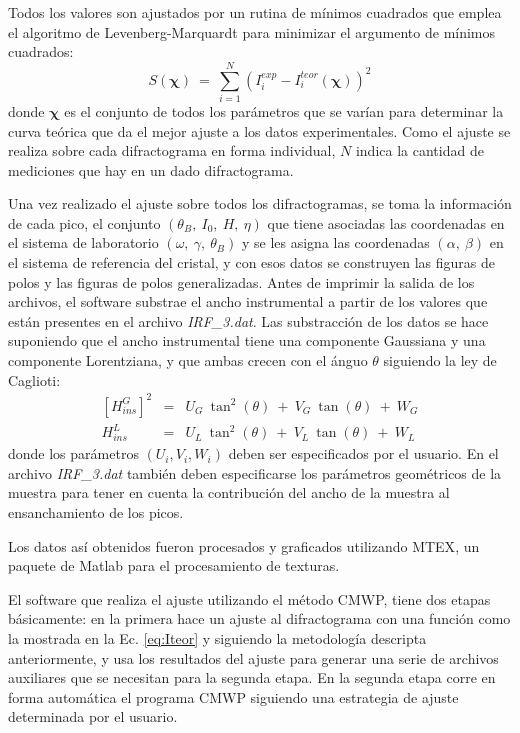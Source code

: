 Todos los valores son ajustados por un rutina de mínimos cuadrados que emplea el algoritmo de Levenberg-Marquardt\cite{wiki:Levenberg} para minimizar el argumento de mínimos cuadrados:
\begin{equation}
  S(\mathbf{\chi}) \ = \ \sum_{i=1}^{N} (I^{exp}_i - I^{teor}_i(\mathbf{\chi}))^2
  \label{eq:argmin}
\end{equation}
\noindent
donde $\mathbf{\chi}$ es el conjunto de todos los parámetros que se varían para determinar la curva teórica que da el mejor ajuste a los datos experimentales.
Como el ajuste se realiza sobre cada difractograma en forma individual, $N$ indica la cantidad de mediciones que hay en un dado difractograma.

Una vez realizado el ajuste sobre todos los difractogramas, se toma la información de cada pico, el conjunto $(\theta_B, \ I_0, \ H, \ \eta)$ que tiene asociadas las coordenadas en el sistema de laboratorio $(\omega, \ \gamma, \ \theta_B)$ y se les asigna las coordenadas  $(\alpha, \ \beta)$ en el sistema de referencia del cristal, y con esos datos se construyen las figuras de polos y las figuras de polos generalizadas.
Antes de imprimir la salida de los archivos, el software substrae el ancho instrumental a partir de los valores que están presentes en el archivo \textit{IRF\_3.dat}.
Las substracción de los datos se hace suponiendo que el ancho instrumental tiene una componente Gaussiana y una componente Lorentziana, y que ambas crecen con el ánguo $\theta$ siguiendo la ley de Caglioti\cite{Caglioti1958}:
\begin{eqnarray}
  \left[H_{ins}^{G}\right]^2 & = & U_G \ \tan^2(\theta) \ + \ V_G \ \tan(\theta) \ + \ W_G \\
  H_{ins}^{L} & = & U_L \ \tan^2(\theta) \ + \ V_L \ \tan(\theta) \ + \ W_L
  \label{eq:caglioti}
\end{eqnarray}
\noindent
donde los parámetros $(U_i, V_i, W_i)$ deben ser especificados por el usuario.
En el archivo \textit{IRF\_3.dat} también deben especificarse los parámetros geométricos de la muestra para tener en cuenta la contribución del ancho de la muestra al ensanchamiento de los picos.

Los datos así obtenidos fueron procesados y graficados utilizando MTEX\cite{Hielscher2008}, un paquete de Matlab para el procesamiento de texturas.

El software que realiza el ajuste utilizando el método CMWP, tiene dos etapas básicamente: en la primera hace un ajuste al difractograma con una función como la mostrada en la Ec. \ref{eq:Iteor} y siguiendo la metodología descripta anteriormente, y usa los resultados del ajuste para generar una serie de archivos auxiliares que se necesitan para la segunda etapa.
En la segunda etapa corre en forma automática el programa CMWP siguiendo una estrategia de ajuste determinada por el usuario.

